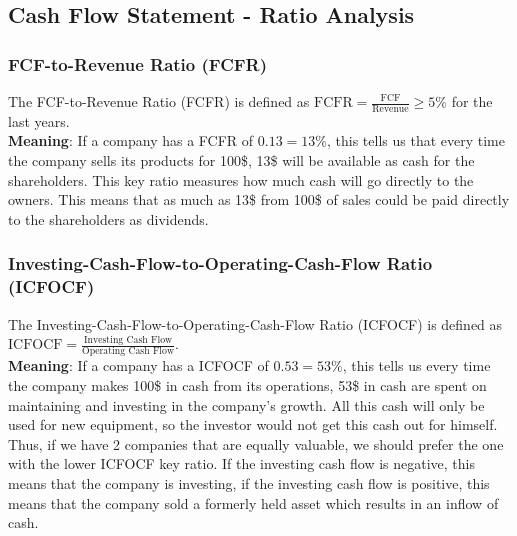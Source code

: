\subsection{Cash Flow Statement - Ratio Analysis}

\subsubsection{FCF-to-Revenue Ratio (FCFR)}

The FCF-to-Revenue Ratio (FCFR) is defined as
$\text{FCFR} = \frac{\text{FCF}}{\text{Revenue}} \geq 5\%$ for the last years.\\
\textbf{Meaning}: If a company has a FCFR of $0.13 = 13\%$, this tells us that
every time the company sells its products for 100\$, 13\$ will be available as
cash for the shareholders. This key ratio measures how much cash will go directly
to the owners. This means that as much as 13\$ from 100\$ of sales could be paid
directly to the shareholders as dividends.

\subsubsection{Investing-Cash-Flow-to-Operating-Cash-Flow Ratio (ICFOCF)}

The Investing-Cash-Flow-to-Operating-Cash-Flow Ratio (ICFOCF) is defined as
$\text{ICFOCF} = \frac{\text{Investing Cash Flow}}{\text{Operating Cash Flow}}$.\\
\textbf{Meaning}: If a company has a ICFOCF of $0.53 = 53\%$, this tells us every
time the company makes 100\$ in cash from its operations, 53\$ in cash are spent
on maintaining and investing in the company's growth. All this cash will only be
used for new equipment, so the investor would not get this cash out for himself.
Thus, if we have 2 companies that are equally valuable, we should prefer the one
with the lower ICFOCF key ratio. If the investing cash flow is negative, this means
that the company is investing, if the investing cash flow is positive, this means
that the company sold a formerly held asset which results in an inflow of cash.
